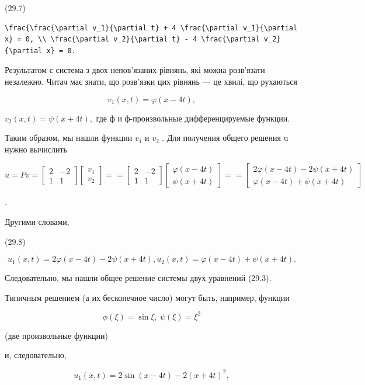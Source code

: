 \documentclass[
  ukrainian,
]{article}
\begin{document}
(29.7)

\begin{verbatim}
\frac{\frac{\partial v_1}{\partial t} + 4 \frac{\partial v_1}{\partial x} = 0, \\ \frac{\partial v_2}{\partial t} - 4 \frac{\partial v_2}{\partial x} = 0.
\end{verbatim}

Результатом є система з двох непов'язаних рівнянь, які можна розв'язати
незалежно. Читач має знати, що розв'язки цих рівнянь --- це хвилі, що
рухаються

\[
v_1(x, t) = \varphi(x-4t),
\]

\(v_2(x, t) = \psi(x+4t),\) где ф и ф-произвольные дифференцируемые
функции.

Таким образом, мы нашли функции \(v_1\) и \(v_2\) . Для получения общего
решения u нужно вычислить

\[
u = Pv =
\begin{bmatrix} 2 & -2 \\ 1 & 1 \end{bmatrix}
\begin{bmatrix} v_1 \\ v_2 \end{bmatrix}
=
=
\begin{bmatrix} 2 & -2 \\ 1 & 1 \end{bmatrix}
\begin{bmatrix} \varphi(x - 4t) \\ \psi(x + 4t) \end{bmatrix}
=
=
\begin{bmatrix} 2\varphi(x - 4t) - 2\psi(x + 4t) \\ \varphi(x - 4t) + \psi(x + 4t) \end{bmatrix}
\]

.

Другими словами,

(29.8)

\[
u_1(x, t) = 2\varphi(x-4t) - 2\psi(x+4t), u_2(x, t) = \varphi(x-4t) + \psi(x+4t).
\]

Следовательно, мы нашли общее решение системы двух уравнений (29.3).

Типичным решением (а их бесконечное число) могут быть, например, функции

\[
\phi(\xi) = \sin \xi, \ \psi(\xi) = \xi^2
\]

(две произвольные функции)

и, следовательно,

\[
u_1(x, t) = 2 \sin(x-4t) - 2(x+4t)^2,
\]
\end{document}
